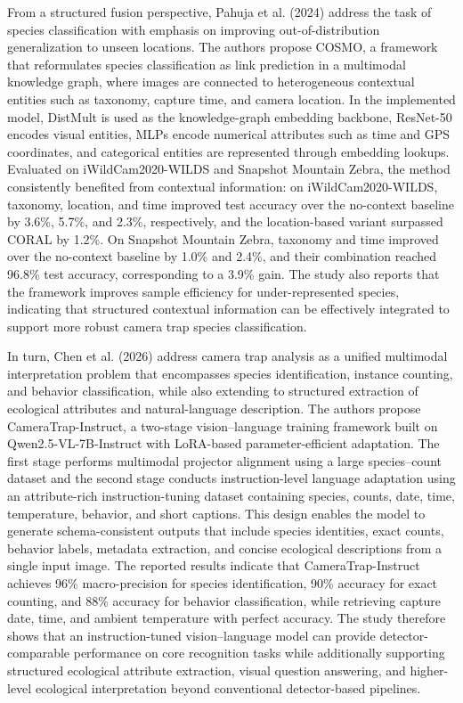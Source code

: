 From a structured fusion perspective, Pahuja et al. (2024) \citep{pahuja2024reviving} address the task of species classification with emphasis on improving out-of-distribution generalization to unseen locations. The authors propose COSMO, a framework that reformulates species classification as link prediction in a multimodal knowledge graph, where images are connected to heterogeneous contextual entities such as taxonomy, capture time, and camera location. In the implemented model, DistMult is used as the knowledge-graph embedding backbone, ResNet-50 encodes visual entities, MLPs encode numerical attributes such as time and GPS coordinates, and categorical entities are represented through embedding lookups. Evaluated on iWildCam2020-WILDS and Snapshot Mountain Zebra, the method consistently benefited from contextual information: on iWildCam2020-WILDS, taxonomy, location, and time improved test accuracy over the no-context baseline by 3.6\%, 5.7\%, and 2.3\%, respectively, and the location-based variant surpassed CORAL by 1.2\%. On Snapshot Mountain Zebra, taxonomy and time improved over the no-context baseline by 1.0\% and 2.4\%, and their combination reached 96.8\% test accuracy, corresponding to a 3.9\% gain. The study also reports that the framework improves sample efficiency for under-represented species, indicating that structured contextual information can be effectively integrated to support more robust camera trap species classification.

In turn, Chen et al. (2026) \citep{chen2026cameratrap} address camera trap analysis as a unified multimodal interpretation problem that encompasses species identification, instance counting, and behavior classification, while also extending to structured extraction of ecological attributes and natural-language description. The authors propose CameraTrap-Instruct, a two-stage vision–language training framework built on Qwen2.5-VL-7B-Instruct with LoRA-based parameter-efficient adaptation. The first stage performs multimodal projector alignment using a large species–count dataset and the second stage conducts instruction-level language adaptation using an attribute-rich instruction-tuning dataset containing species, counts, date, time, temperature, behavior, and short captions. This design enables the model to generate schema-consistent outputs that include species identities, exact counts, behavior labels, metadata extraction, and concise ecological descriptions from a single input image. The reported results indicate that CameraTrap-Instruct achieves 96\% macro-precision for species identification, 90\% accuracy for exact counting, and 88\% accuracy for behavior classification, while retrieving capture date, time, and ambient temperature with perfect accuracy. The study therefore shows that an instruction-tuned vision–language model can provide detector-comparable performance on core recognition tasks while additionally supporting structured ecological attribute extraction, visual question answering, and higher-level ecological interpretation beyond conventional detector-based pipelines.

